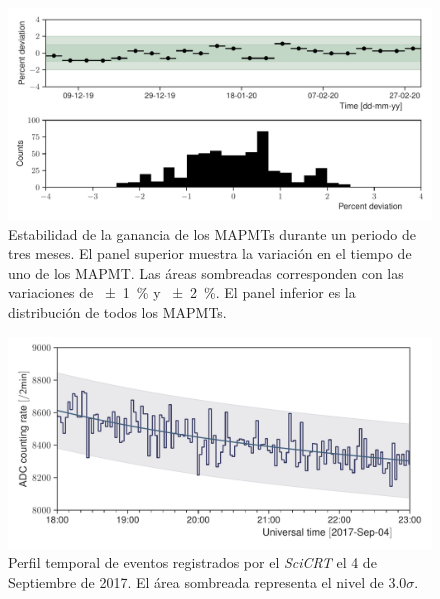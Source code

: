 \begin{figure}
        \centering
        \includegraphics[width=\textwidth]{neutron-mip_stability.pdf}
        \caption{Estabilidad de la ganancia de los MAPMTs durante un periodo de tres meses. El panel superior muestra la variación en el tiempo de uno de los MAPMT. Las áreas sombreadas corresponden con las variaciones de \SI{\pm 1}{\percent} y \SI{\pm 2}{\percent}. El panel inferior es la distribución de todos los MAPMTs.}
        \label{fig:mip-stability}
\end{figure}



\begin{figure}
        \centering
        \includegraphics[width=\textwidth]{neutron-170904.pdf}
        \caption{Perfil temporal de eventos registrados por el \emph{SciCRT} el \num{4} de Septiembre de \num{2017}. El área sombreada representa el nivel de $3.0\sigma$.}
        \label{fig:september-04}
\end{figure}

